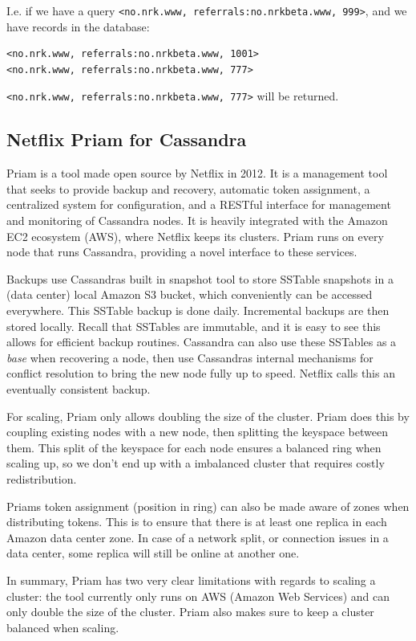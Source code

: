 I.e. if we have a query \texttt{<no.nrk.www, referrals:no.nrkbeta.www, 999>}, and we have records in the database:
\begin{lstlisting}
<no.nrk.www, referrals:no.nrkbeta.www, 1001>
<no.nrk.www, referrals:no.nrkbeta.www, 777>
\end{lstlisting}
\texttt{<no.nrk.www, referrals:no.nrkbeta.www, 777>} will be returned.

\subsection{Netflix Priam for Cassandra}
Priam is a tool made open source by Netflix in 2012. It is a management tool that seeks to provide backup and recovery, automatic token assignment, a centralized system for configuration, and a RESTful interface for management and monitoring of Cassandra nodes. It is heavily integrated with the Amazon EC2 ecosystem (AWS), where Netflix keeps its clusters.
Priam runs on every node that runs Cassandra, providing a novel interface to these services.

Backups use Cassandras built in snapshot tool to store SSTable snapshots in a (data center) local Amazon S3 bucket, which conveniently can be accessed everywhere.
This SSTable backup is done daily. Incremental backups are then stored locally. Recall that SSTables are immutable, and it is easy to see this allows for efficient backup routines. Cassandra can also use these SSTables as a \emph{base} when recovering a node, then use Cassandras internal mechanisms for conflict resolution to bring the new node fully up to speed. Netflix calls this an eventually consistent backup.

For scaling, Priam only allows doubling the size of the cluster. Priam does this by coupling existing nodes with a new node, then splitting the keyspace between them. This split of the keyspace for each node ensures a balanced ring when scaling up, so we don't end up with a imbalanced cluster that requires costly redistribution.

Priams token assignment (position in ring) can also be made aware of zones when distributing tokens. This is to ensure that there is at least one replica in each Amazon data center zone. In case of a network split, or connection issues in a data center, some replica will still be online at another one.

In summary, Priam has two very clear limitations with regards to scaling a cluster: the tool currently only runs on AWS (Amazon Web Services) and can only double the size of the cluster. Priam also makes sure to keep a cluster balanced when scaling.

